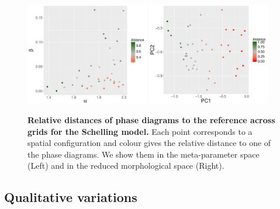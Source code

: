 \documentclass[Royal,sageh,times]{sagej}
\begin{document}
\begin{figure}
\centering
\includegraphics[width=0.48\textwidth]{figures/schelling-relativedistance_metaparams}
\includegraphics[width=0.48\textwidth]{figures/schelling-relativedistance_morphspace}
\caption{\textbf{Relative distances of phase diagrams to the reference across grids for the Schelling model.} Each point corresponds to a spatial configuration and colour gives the relative distance to one of the phase diagrams. We show them in the meta-parameter space (Left) and in the reduced morphological space (Right).\label{fig:schelling-distance-meta}}
\end{figure}





\subsection{Qualitative variations}
\end{document}
